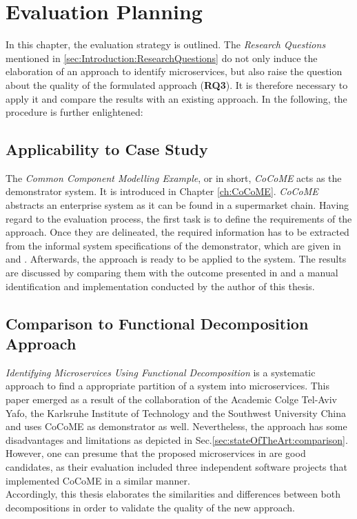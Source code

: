 \chapter{Evaluation Planning}
\label{ch:EvalutationPlanning}
In this chapter, the evaluation strategy is outlined. The \textit{Research Questions} mentioned in \ref{sec:Introduction:ResearchQuestions} do not only induce the elaboration of an approach to identify microservices, but also raise the question about the quality of the formulated approach (\textbf{RQ3}). It is therefore necessary to apply it and compare the results with an existing approach. In the following, the procedure is further enlightened:

\section{Applicability to Case Study}
\label{sec:EvaluationPlanning:ApplicabilityToCoCoME}
The \textit{Common Component Modelling Example}, or in short, \textit{CoCoME} acts as the demonstrator system. It is  introduced in Chapter \ref{ch:CoCoME}. \textit{CoCoME} abstracts an enterprise system as it can be found in a supermarket chain. Having regard to the evaluation process, the first task is to define the requirements of the approach. Once they are delineated, the required information has to be extracted from the informal system specifications of the demonstrator, which are given in \cite{CoCoMEOld} and \cite{CoCoMETechnical}. Afterwards, the approach is ready to be applied to the system. The results are discussed by comparing them with the outcome presented in \cite{FunctionalDecompositionHeinrich} and a manual identification and implementation conducted by the author of this thesis.


\section{Comparison to Functional Decomposition Approach}
\textit{Identifying Microservices Using Functional Decomposition} \cite{FunctionalDecompositionHeinrich} is a systematic approach to find a appropriate partition of a system into microservices. This paper emerged as a result of the collaboration of the Academic Colge Tel-Aviv Yafo, the Karlsruhe Institute of Technology and the Southwest University China and uses CoCoME as demonstrator as well. Nevertheless, the approach has some disadvantages and limitations as depicted in Sec.\ref{sec:stateOfTheArt:comparison}. 
\\
However, one can presume that the proposed microservices in \cite{FunctionalDecompositionHeinrich} are good candidates, as their evaluation included three independent software projects that implemented CoCoME in a similar manner. \\
Accordingly, this thesis elaborates the similarities and differences between both decompositions in order to validate the quality of the new approach.
